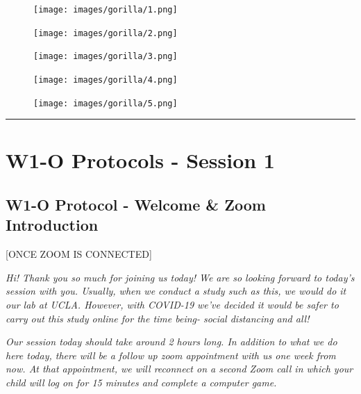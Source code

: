 \documentclass[
]{book}
\begin{document}
\begin{figure}
\centering
\texttt{[image: images/gorilla/1.png]}
\caption{}
\end{figure}

\begin{figure}
\centering
\texttt{[image: images/gorilla/2.png]}
\caption{}
\end{figure}

\begin{figure}
\centering
\texttt{[image: images/gorilla/3.png]}
\caption{}
\end{figure}

\begin{figure}
\centering
\texttt{[image: images/gorilla/4.png]}
\caption{}
\end{figure}

\begin{figure}
\centering
\texttt{[image: images/gorilla/5.png]}
\caption{}
\end{figure}

\begin{center}\rule{0.5\linewidth}{0.5pt}\end{center}

\hypertarget{w1-o-protocols---session-1}{%
\section{W1-O Protocols - Session 1}\label{w1-o-protocols---session-1}}

\hypertarget{w1-o-protocol---welcome-zoom-introduction}{%
\subsection{W1-O Protocol - Welcome \& Zoom Introduction}\label{w1-o-protocol---welcome-zoom-introduction}}

{[}ONCE ZOOM IS CONNECTED{]}

\emph{Hi! Thank you so much for joining us today! We are so looking forward to today's session with you. Usually, when we conduct a study such as this, we would do it our lab at UCLA. However, with COVID-19 we've decided it would be safer to carry out this study online for the time being- social distancing and all!}

\emph{Our session today should take around 2 hours long. In addition to what we do here today, there will be a follow up zoom appointment with us one week from now. At that appointment, we will reconnect on a second Zoom call in which your child will log on for 15 minutes and complete a computer game.}
\end{document}
